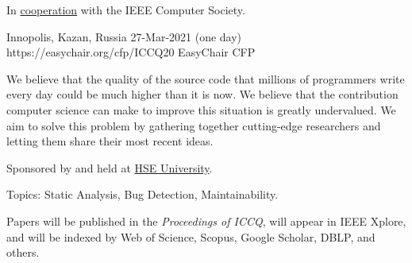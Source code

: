\documentclass{../cfp}
\begin{document}
\PrintLogo{}



In
\href{https://conferences.ieee.org/conferences_events/conferences/conferencedetails/51190}{cooperation}
with the IEEE Computer Society.

\vspace{6pt}

\PrintAddress
  {Innopolis, Kazan, Russia}
  {27-Mar-2021 (one day)}
  {https://easychair.org/cfp/ICCQ20}
  {EasyChair CFP}

\vspace{12pt}
%
%
%

\vspace{6pt}

We believe that the quality of the source code that millions of programmers
write every day could be much higher than it is now. We believe that the
contribution computer science can make to improve this situation is greatly
undervalued. We aim to solve this problem by gathering
together cutting-edge researchers and letting them share their most recent ideas.

Sponsored by and held at \href{https://www.hse.ru/en/}{HSE University}.

Topics: Static Analysis, Bug Detection, Maintainability.

Papers will be published in the \textit{Proceedings of ICCQ},
will appear in IEEE Xplore\textsuperscript{\textregistered},
and will be indexed by Web of Science, Scopus, Google Scholar, DBLP, and others.
\end{document}
